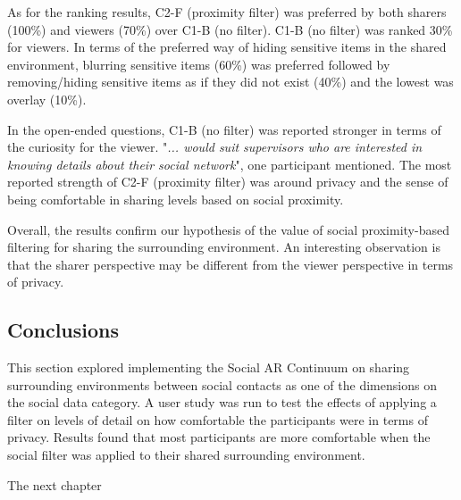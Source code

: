 As for the ranking results, C2-F (proximity filter) was preferred by both sharers (100\%) and viewers (70\%) over C1-B (no filter). C1-B (no filter) was ranked 30\% for viewers. In terms of the preferred way of hiding sensitive items in the shared environment, blurring sensitive items (60\%) was preferred followed by removing/hiding sensitive items as if they did not exist (40\%) and the lowest was overlay (10\%). 

In the open-ended questions, C1-B (no filter) was reported stronger in terms of the curiosity for the viewer. "\textit{... would suit supervisors who are interested in knowing details about their social network}", one participant mentioned. The most reported strength of C2-F (proximity filter) was around privacy and the sense of being comfortable in sharing levels based on social proximity. 

Overall, the results confirm our hypothesis of the value of social proximity-based filtering for sharing the surrounding environment. An interesting observation is that the sharer perspective may be different from the viewer perspective in terms of privacy. 


\subsection{Conclusions}

This section explored implementing the Social AR Continuum on sharing surrounding environments between social contacts as one of the dimensions on the social data category. A user study was run to test the effects of applying a filter on levels of detail on how comfortable the participants were in terms of privacy. Results found that most participants are more comfortable when the social filter was applied to their shared surrounding environment.

The next chapter 